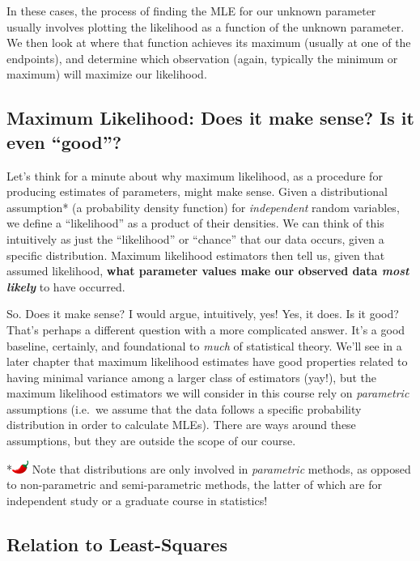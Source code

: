 \documentclass[
  letterpaper,
  DIV=11,
  numbers=noendperiod]{scrreprt}
\begin{document}
In these cases, the process of finding the MLE for our unknown parameter
usually involves plotting the likelihood as a function of the unknown
parameter. We then look at where that function achieves its maximum
(usually at one of the endpoints), and determine which observation
(again, typically the minimum or maximum) will maximize our likelihood.

\subsection*{Maximum Likelihood: Does it make sense? Is it even
``good''?}\label{maximum-likelihood-does-it-make-sense-is-it-even-good}

Let's think for a minute about why maximum likelihood, as a procedure
for producing estimates of parameters, might make sense. Given a
distributional assumption* (a probability density function) for
\emph{independent} random variables, we define a ``likelihood'' as a
product of their densities. We can think of this intuitively as just the
``likelihood'' or ``chance'' that our data occurs, given a specific
distribution. Maximum likelihood estimators then tell us, given that
assumed likelihood, \textbf{what parameter values make our observed data
\emph{most likely}} to have occurred.

So. Does it make sense? I would argue, intuitively, yes! Yes, it does.
Is it good? That's perhaps a different question with a more complicated
answer. It's a good baseline, certainly, and foundational to \emph{much}
of statistical theory. We'll see in a later chapter that maximum
likelihood estimates have good properties related to having minimal
variance among a larger class of estimators (yay!), but the maximum
likelihood estimators we will consider in this course rely on
\emph{parametric} assumptions (i.e.~we assume that the data follows a
specific probability distribution in order to calculate MLEs). There are
ways around these assumptions, but they are outside the scope of our
course.

*\includegraphics[width=0.20833in,height=0.16667in]{images/chilipepper.png}
Note that distributions are only involved in \emph{parametric} methods,
as opposed to non-parametric and semi-parametric methods, the latter of
which are for independent study or a graduate course in statistics!

\subsection*{Relation to Least-Squares}\label{relation-to-least-squares}
\end{document}
